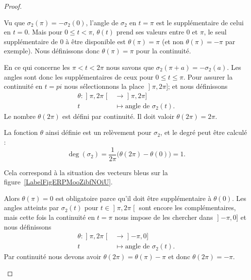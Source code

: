 \begin{proof}
\begin{subproof}
\begin{subproof}
			Vu que \( \sigma_2(\pi)=-\sigma_2(0)\), l'angle de \( \sigma_2\) en \( t=\pi\) est le supplémentaire de celui en \( t=0\). Mais pour \( 0\leq t<\pi\), \( \theta(t)\) prend ses valeurs entre \( 0\) et \( \pi\), le seul supplémentaire de \( 0\) à être disponible est \( \theta(\pi)=\pi\) (et non \( \theta(\pi)=-\pi\) par exemple). Nous définissons donc \( \theta(\pi)=\pi\) pour la continuité.

			En ce qui concerne les \( \pi<t< 2\pi\) nous savons que \( \sigma_2(\pi+a)=-\sigma_2(a)\). Les angles sont donc les supplémentaires de ceux pour \( 0\leq t\leq \pi\). Pour assurer la continuité en \( t=pi\) nous sélectionnons la place \( \mathopen] \pi , 2\pi \mathclose]\); et nous définissons
			\begin{equation}
				\begin{aligned}
					\theta\colon \mathopen] \pi , 2\pi \mathclose[ & \to \mathopen] \pi , 2\pi \mathclose] \\
					t                                              & \mapsto \text{angle de } \sigma_2(t).
				\end{aligned}
			\end{equation}
			Le nombre \( \theta(2\pi)\) est défini par continuité. Il doit valoir \( \theta(2\pi)=2\pi\).

			La fonction \( \theta\) ainsi définie est un relèvement pour \( \sigma_2\), et le degré peut être calculé :
			\begin{equation}
				\deg(\sigma_2)=\frac{1}{ 2\pi }\big( \theta(2\pi)-\theta(0) \big)=1.
			\end{equation}

			\newcommand{\CaptionFigERPMooZibfNOiU}{Les vecteurs représenant \( \sigma_2\) dans le cas où \( \beta'(0)\) est dans le sens de \( \ell_p\) ou dans le sens inverse. Pour le sport nous avons dessiné la situation avec une droite \( \ell\) quelconque plutôt que horizontale.}
			

			\spitem[Si \( \theta(0)=\pi\)]
			Cela correspond à la situation des vecteurs bleus sur la figure~\ref{LabelFigERPMooZibfNOiU}.

			Alors \( \theta(\pi)=0\) est obligatoire parce qu'il doit être supplémentaire à \( \theta(0)\). Les angles atteints par \( \sigma_2(t)\) pour \( t\in\mathopen] \pi , 2\pi \mathclose[ \) sont encore les complémentaires, mais cette fois la continuité en \( t=\pi\) nous impose de les chercher dans \( \mathopen] -\pi , 0 \mathclose]\) et nous définissons
			\begin{equation}
				\begin{aligned}
					\theta\colon \mathopen] \pi , 2\pi \mathclose[ & \to \mathopen] -\pi , 0 \mathclose]   \\
					t                                              & \mapsto \text{angle de } \sigma_2(t).
				\end{aligned}
			\end{equation}
			Par continuité nous devons avoir \( \theta(2\pi)=\theta(\pi)-\pi\) et donc \( \theta(2\pi)=-\pi\).


\end{subproof}
\end{subproof}
\end{proof}
